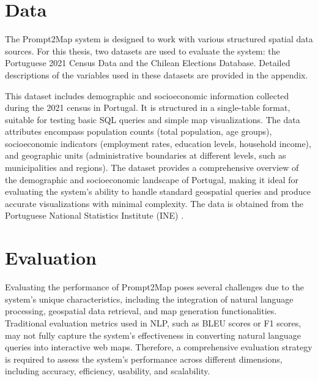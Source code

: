 \section{Data}
The Prompt2Map system is designed to work with various structured spatial data sources. For this thesis, two datasets are used to evaluate the system: the Portuguese 2021 Census Data and the Chilean Elections Database. Detailed descriptions of the variables used in these datasets are provided in the appendix.

This dataset includes demographic and socioeconomic information collected during the 2021 census in Portugal. It is structured in a single-table format, suitable for testing basic SQL queries and simple map visualizations. The data attributes encompass population counts (total population, age groups), socioeconomic indicators (employment rates, education levels, household income), and geographic units (administrative boundaries at different levels, such as municipalities and regions). The dataset provides a comprehensive overview of the demographic and socioeconomic landscape of Portugal, making it ideal for evaluating the system's ability to handle standard geospatial queries and produce accurate visualizations with minimal complexity. The data is obtained from the Portuguese National Statistics Institute (INE) \cite{INE2021Census}.

\section{Evaluation}


Evaluating the performance of Prompt2Map poses several challenges due to the system's unique characteristics, including the integration of natural language processing, geospatial data retrieval, and map generation functionalities. Traditional evaluation metrics used in NLP, such as BLEU scores or F1 scores, may not fully capture the system's effectiveness in converting natural language queries into interactive web maps. Therefore, a comprehensive evaluation strategy is required to assess the system's performance across different dimensions, including accuracy, efficiency, usability, and scalability.


